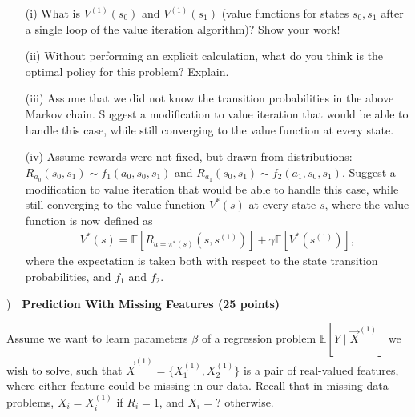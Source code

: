 \documentclass[11pt]{article}
\newcounter{questionnumber}
\newcommand{\questionnumber}{\noindent \arabic{questionnumber}\stepcounter{questionnumber})~~}
\begin{document}
\begin{itemize}
\item[(i)] What is $V^{(1)}(s_0)$ and $V^{(1)}(s_1)$ (value functions for states $s_0,s_1$ after a single loop of the value iteration algorithm)?  Show your work!


\vspace{0.5cm}

\item[(ii)] Without performing an explicit calculation, what do you think is the optimal policy for this problem?  Explain.


\vspace{0.5cm}

\pagebreak

\item[(iii)] Assume that we did not know the transition probabilities in the above Markov chain.  Suggest a modification to value iteration that would be able to handle
this case, while still converging to the value function at every state.


\vspace{0.5cm}

\item[(iv)] Assume rewards were not fixed, but drawn from distributions:
$R_{a_0}(s_0, s_1)\sim f_1(a_0,s_0,s_1)$ and $R_{a_1}(s_0, s_1) \sim f_2(a_1,s_0,s_1)$.  Suggest a modification to value iteration that would be able to handle
this case, while still converging to the value function $V^*(s)$ at every state $s$, where the value function is now defined as
{\small
\begin{align*}
V^*(s) = \mathbb{E}[ R_{a = \pi^*(s)}(s, s^{(1)})] + \gamma \mathbb{E}[ V^*(s^{(1)}) ],
\end{align*}
}
where the expectation is taken both with respect to the state transition probabilities, and $f_1$ and $f_2$.


\vspace{0.5cm}

\end{itemize}

\newpage

\questionnumber {\bf Prediction With Missing Features (25 points)}

Assume we want to learn parameters $\beta$ of a regression problem $\mathbb{E}[Y \mid \vec{X}^{(1)}]$  we wish to solve, such that $\vec{X}^{(1)} = \{ X^{(1)}_1, X^{(1)}_2 \}$ is a pair of real-valued features, where either feature could be missing in our data.  Recall that in missing data problems, $X_i = X^{(1)}_i$ if $R_i = 1$, and $X_i = ?$ otherwise.
\end{document}
